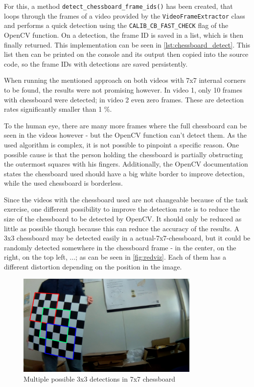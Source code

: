 For this, a method \texttt{detect\_chessboard\_frame\_ids()} has been created, that loops through the frames of a video provided by the \texttt{VideoFrameExtractor} class and performs a quick detection using the \texttt{CALIB\_CB\_FAST\_CHECK} flag of the OpenCV function. On a detection, the frame ID is saved in a list, which is then finally returned. This implementation can be seen in \autoref{lst:chessboard_detect}. This list then can be printed on the console and its output then copied into the source code, so the frame IDs with detections are saved persistently.

When running the mentioned approach on both videos with 7x7 internal corners to be found, the results were not promising however. In video 1, only 10 frames with chessboard were detected; in video 2 even zero frames. These are detection rates significantly smaller than 1 \%.

To the human eye, there are many more frames where the full chessboard can be seen in the videos however - but the OpenCV function can't detect them. As the used algorithm is complex, it is not possible to pinpoint a specific reason. One possible cause is that the person holding the chessboard is partially obstructing the outermost squares with his fingers. Additionally, the OpenCV documentation states the chessboard used should have a big white border to improve detection, while the used chessboard is borderless. \cite{cv_cctut}

Since the videos with the chessboard used are not changeable because of the task exercise, one different possibility to improve the detection rate is to reduce the size of the chessboard to be detected by OpenCV. It should only be reduced as little as possible though because this can reduce the accuracy of the results. A 3x3 chessboard may be detected easily in a actual-7x7-chessboard, but it could be randomly detected somewhere in the chessboard frame - in the center, on the right, on the top left, ...; as can be seen in \autoref{fig:redviz}. Each of them has a different distortion depending on the position in the image.

\begin{figure}[h]
    \centering
    \includegraphics[width=0.8\textwidth]{figures/red_viz.jpg}
    \caption{Multiple possible 3x3 detections in 7x7 chessboard}
    \label{fig:redviz}
\end{figure}


